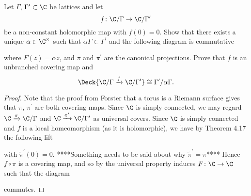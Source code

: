 \documentclass[10pt]{amsart}
\begin{document}
\begin{thm}
  Let $\Gamma$, $\Gamma^\prime \subset \C$ be lattices and let
  $$f \colon \C / \Gamma \rightarrow \C / \Gamma^\prime$$
  be a non-constant holomorphic map with $f(0) = 0$.
  Show that there exists a unique $\alpha \in \C^\times$ such that $\alpha\Gamma \subset \Gamma^\prime$ and the following diagram is commutative
  \begin{center}
  \end{center}
  where $F(z) = \alpha z$, and $\pi$ and $\pi^\prime$ are the canonical projections.
  Prove that $f$ is an unbranched covering map and
  $$\Deck{\C/\Gamma \xrightarrow{f} \C/\Gamma^\prime} \cong \Gamma^\prime / \alpha\Gamma.$$

  \begin{proof}
    Note that the proof from Forster that a torus is a Riemann surface gives that $\pi$, $\pi^\prime$ are both covering maps.
    Since $\C$ is simply connected, we may regard $\C \xrightarrow{\pi} \C/\Gamma$ and $\C \xrightarrow{\pi^\prime} \C/\Gamma^\prime$ as universal covers.
    Since $\C$ is simply connected and $f$ is a local homeomorphism (as it is holomorphic), we have by Theorem 4.17 the following lift
    \begin{center}
    \end{center}
    with $\tilde{\pi}^\prime(0) = 0$.
    ****Something needs to be said about why $\tilde{\pi}^\prime = \pi$****
    Hence $f \circ \pi$ is a covering map, and so by the universal property induces $F \colon \C \rightarrow \C$ such that the diagram
    \begin{center}
    \end{center}
    commutes.

  \end{proof}
\end{thm}
\end{document}
